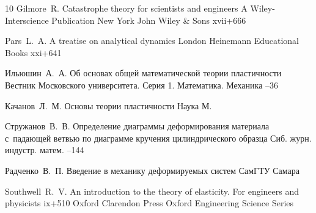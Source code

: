 \begin{thebibliography}{10}
\by Gilmore~R.
\book Catastrophe theory for scientists and engineers
\serial A Wiley-Interscience Publication
\publaddr New York 
\publ John Wiley \& Sons
\totalpages xvii+666 

\by Pars~L.~A.
\book A treatise on analytical dynamics
\publaddr London
\publ Heinemann Educational Books 
\totalpages xxi+641 
 
\by Ильюшин~А.~А.
\paper Об основах общей математической теории пластичности
\jour Вестник Московского университета. Серия 1. Математика. Механика
--36

\by Качанов~Л.~М.
\book Основы теории пластичности
\publ Наука
\publaddr М.

\by Стружанов~В.~В.
\paper Определение диаграммы деформирования материала с~падающей ветвью по диаграмме кручения цилиндрического образца
\jour Сиб. журн. индустр. матем.
--144

\by Радченко~В.~П.
\book Введение в механику деформируемых систем
\publ СамГТУ
\publaddr Самара

\by Southwell~R.~V.
\book An introduction to the theory of elasticity. For engineers and physicists
\totalpages ix+510 
\publaddr Oxford
\publ Clarendon Press
\serial Oxford Engineering Science Series


\end{thebibliography}


\newpage

\makeentitle

\vspace{-5mm}

